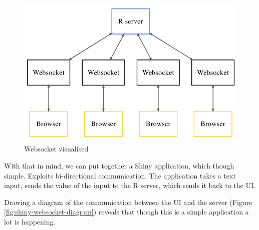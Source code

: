 \documentclass[10pt,]{krantz}
\makeatletter
\newenvironment{Shaded}{\begin{snugshade}}{\end{snugshade}}
\newcommand{\ControlFlowTok}[1]{\textcolor[rgb]{0.27,0.27,0.27}{\textbf{#1}}}
\newcommand{\KeywordTok}[1]{\textcolor[rgb]{0.27,0.27,0.27}{\textbf{#1}}}
\newcommand{\NormalTok}[1]{#1}
\newcommand{\OperatorTok}[1]{\textcolor[rgb]{0.43,0.43,0.43}{\textbf{#1}}}
\newcommand{\StringTok}[1]{\textcolor[rgb]{0.5,0.5,0.5}{#1}}
\newenvironment{kframe}{%
\medskip{}
\setlength{\fboxsep}{.8em}
 \def\at@end@of@kframe{}%
 \ifinner\ifhmode%
  \def\at@end@of@kframe{\end{minipage}}%
  \begin{minipage}{\columnwidth}%
 \fi\fi%
 \def\FrameCommand##1{\hskip\@totalleftmargin \hskip-\fboxsep
 \colorbox{shadecolor}{##1}\hskip-\fboxsep
     \hskip-\linewidth \hskip-\@totalleftmargin \hskip\columnwidth}%
 \MakeFramed {\advance\hsize-\width
   \@totalleftmargin\z@ \linewidth\hsize
   \@setminipage}}%
 {\par\unskip\endMakeFramed%
 \at@end@of@kframe}
\renewenvironment{Shaded}{\begin{kframe}}{\end{kframe}}
\makeatother
\begin{document}
\begin{figure}[H]

{\centering \includegraphics[width=1\linewidth]{images/04-websocket} 

}

\caption{Websocket visualised}\label{fig:websocket-diag}
\end{figure}

With that in mind, we can put together a Shiny application, which though simple. Exploits bi-directional communication. The application takes a text input, sends the value of the input to the R server, which sends it back to the UI.

\begin{Shaded}
\end{Shaded}

Drawing a diagram of the communication between the UI and the server (Figure \ref{fig:shiny-websocket-diagram}) reveals that though this is a simple application a lot is happening.
\end{document}
